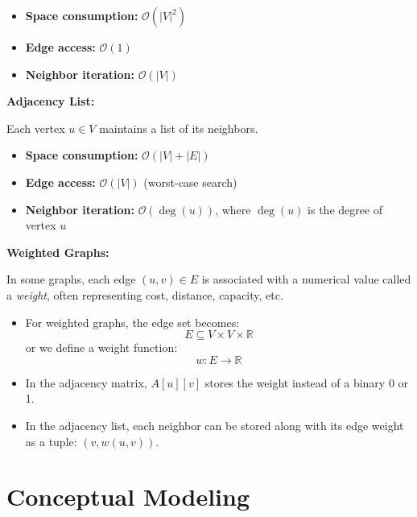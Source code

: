\documentclass{article}
\begin{document}
\begin{itemize}
    \item \textbf{Space consumption:} \( \mathcal{O}(|V|^2) \)
    \item \textbf{Edge access:} \( \mathcal{O}(1) \)
    \item \textbf{Neighbor iteration:} \( \mathcal{O}(|V|) \)
\end{itemize}

\textbf{Adjacency List:}

Each vertex \( u \in V \) maintains a list of its neighbors.

\begin{itemize}
    \item \textbf{Space consumption:} \( \mathcal{O}(|V| + |E|) \)
    \item \textbf{Edge access:} \( \mathcal{O}(|V|) \) (worst-case search)
    \item \textbf{Neighbor iteration:} \( \mathcal{O}(\deg(u)) \), where \( \deg(u) \) is the degree of vertex \( u \)
\end{itemize}

    \textbf{Weighted Graphs:}  

    In some graphs, each edge \( (u, v) \in E \) is associated with a numerical value called a \textit{weight}, often representing cost, distance, capacity, etc.
    
    \begin{itemize}
        \item For weighted graphs, the edge set becomes:  
        \[
        E \subseteq V \times V \times \mathbb{R}
        \]
        or we define a weight function:  
        \[
        w : E \rightarrow \mathbb{R}
        \]
        \item In the adjacency matrix, \( A[u][v] \) stores the weight instead of a binary 0 or 1.
        \item In the adjacency list, each neighbor can be stored along with its edge weight as a tuple: \( (v, w(u, v)) \).
    \end{itemize}   
\newpage
\section{Conceptual Modeling}

\end{document}
